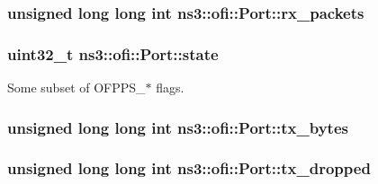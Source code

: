 \subsubsection[{\texorpdfstring{rx\+\_\+packets}{rx_packets}}]{\setlength{\rightskip}{0pt plus 5cm}unsigned {\bf long} {\bf long} int ns3\+::ofi\+::\+Port\+::rx\+\_\+packets}\hypertarget{structns3_1_1ofi_1_1Port_aa3fca333f4e14d5f420129dbe0da407a}{}\label{structns3_1_1ofi_1_1Port_aa3fca333f4e14d5f420129dbe0da407a}
\subsubsection[{\texorpdfstring{state}{state}}]{\setlength{\rightskip}{0pt plus 5cm}uint32\+\_\+t ns3\+::ofi\+::\+Port\+::state}\hypertarget{structns3_1_1ofi_1_1Port_af1ff1ab7860ad741cf29bcf315ca912a}{}\label{structns3_1_1ofi_1_1Port_af1ff1ab7860ad741cf29bcf315ca912a}


Some subset of O\+F\+P\+P\+S\+\_\+$\ast$ flags. 

\subsubsection[{\texorpdfstring{tx\+\_\+bytes}{tx_bytes}}]{\setlength{\rightskip}{0pt plus 5cm}unsigned {\bf long} {\bf long} int ns3\+::ofi\+::\+Port\+::tx\+\_\+bytes}\hypertarget{structns3_1_1ofi_1_1Port_a87cfb7885b1c6163f472707e0ac98459}{}\label{structns3_1_1ofi_1_1Port_a87cfb7885b1c6163f472707e0ac98459}
\subsubsection[{\texorpdfstring{tx\+\_\+dropped}{tx_dropped}}]{\setlength{\rightskip}{0pt plus 5cm}unsigned {\bf long} {\bf long} int ns3\+::ofi\+::\+Port\+::tx\+\_\+dropped}\hypertarget{structns3_1_1ofi_1_1Port_aebeae80328b7502cce5e457f87e5cff6}{}\label{structns3_1_1ofi_1_1Port_aebeae80328b7502cce5e457f87e5cff6}
